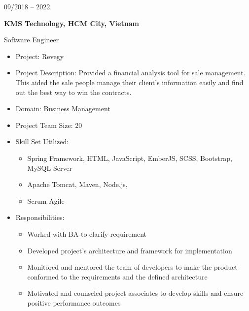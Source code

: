 \documentclass[10pt, letterpapaer]{article}
\newcommand{\bigentry}[3]{
\begin{minipage}[t]{.20\linewidth}
\hfill \textsc{#1}
\end{minipage}
\hfill\vline\hfill
\begin{minipage}[t]{.75\linewidth}
{\bf#2}\\{#3}
\end{minipage}\\
\vspace{.2cm}
}
\begin{document}
\bigentry{09/2018 – 2022}
{KMS Technology, HCM City, Vietnam}
{Software Engineer
\begin{itemize}
  \item Project: Revegy
  \item Project Description: Provided a financial analysis tool for sale management. This aided the sale people manage their client’s information easily and find out the best way to win the contracts.
  \item Domain: Business Management
  \item Project Team Size: 20
  \item Skill Set Utilized:
  \begin{itemize}
	\item Spring Framework, HTML, JavaScript, EmberJS, SCSS, Bootstrap, MySQL Server
	\item Apache Tomcat, Maven, Node.js, 
	\item Scrum Agile
  \end{itemize}
  \item Responsibilities:
  \begin{itemize}
	\item Worked with BA to clarify requirement
	\item Developed project’s architecture and framework for implementation
	\item Monitored and mentored the team of developers to make the product conformed to the requirements and the defined architecture
	\item Motivated and counseled project associates to develop skills and ensure positive performance outcomes
  \end{itemize}
\end{itemize}}
\end{document}
